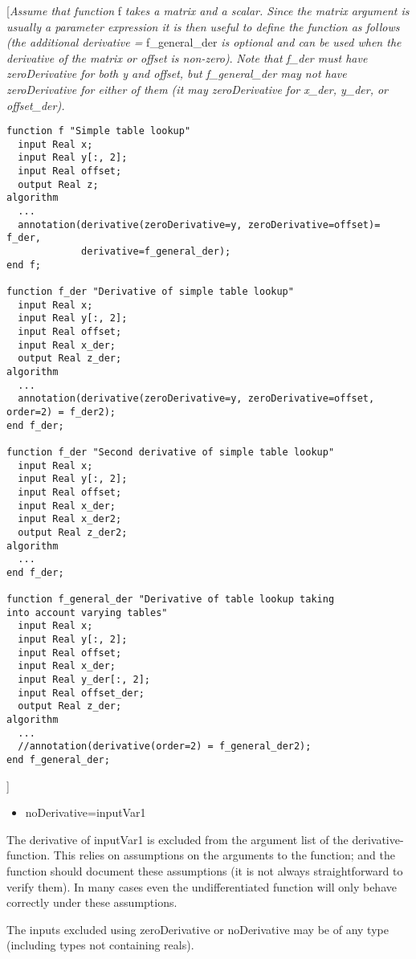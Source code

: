 {[}\emph{Assume that function} f \emph{takes a matrix and a scalar.
Since the matrix argument is usually a parameter expression it is then
useful to define the function as follows (the additional derivative =}
f\_general\_der \emph{is optional and can be used when the derivative of
the matrix or offset is non-zero)}. \emph{Note that f\_der must have
zeroDerivative for both y and offset, but f\_general\_der may not have
zeroDerivative for either of them (it may zeroDerivative for x\_der,
y\_der, or offset\_der).}

\begin{lstlisting}[language=modelica]
function f "Simple table lookup"
  input Real x;
  input Real y[:, 2];
  input Real offset;
  output Real z;
algorithm
  ...
  annotation(derivative(zeroDerivative=y, zeroDerivative=offset)= f_der,
             derivative=f_general_der);
end f;

function f_der "Derivative of simple table lookup"
  input Real x;
  input Real y[:, 2];
  input Real offset;
  input Real x_der;
  output Real z_der;
algorithm
  ...
  annotation(derivative(zeroDerivative=y, zeroDerivative=offset, order=2) = f_der2);
end f_der;

function f_der "Second derivative of simple table lookup"
  input Real x;
  input Real y[:, 2];
  input Real offset;
  input Real x_der;
  input Real x_der2;
  output Real z_der2;
algorithm
  ...
end f_der;

function f_general_der "Derivative of table lookup taking
into account varying tables"
  input Real x;
  input Real y[:, 2];
  input Real offset;
  input Real x_der;
  input Real y_der[:, 2];
  input Real offset_der;
  output Real z_der;
algorithm
  ...
  //annotation(derivative(order=2) = f_general_der2);
end f_general_der;
\end{lstlisting}
{]}

\begin{itemize}
\item
  noDerivative=inputVar1
\end{itemize}

The derivative of inputVar1 is excluded from the argument list of the
derivative-function. This relies on assumptions on the arguments to the
function; and the function should document these assumptions (it is not
always straightforward to verify them). In many cases even the
undifferentiated function will only behave correctly under these
assumptions.

The inputs excluded using zeroDerivative or noDerivative may be of any
type (including types not containing reals).

